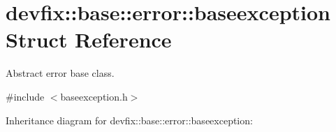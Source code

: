 \hypertarget{structdevfix_1_1base_1_1error_1_1baseexception}{}\section{devfix\+:\+:base\+:\+:error\+:\+:baseexception Struct Reference}
\label{structdevfix_1_1base_1_1error_1_1baseexception}


Abstract error base class.  




{\ttfamily \#include $<$baseexception.\+h$>$}



Inheritance diagram for devfix\+:\+:base\+:\+:error\+:\+:baseexception\+:
